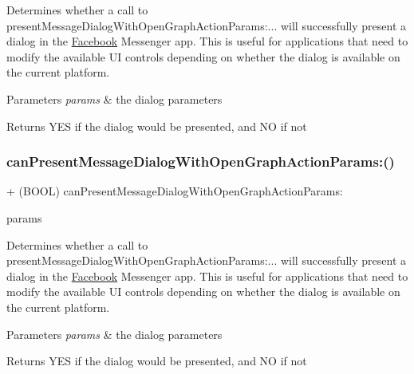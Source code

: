 Determines whether a call to {\ttfamily present\+Message\+Dialog\+With\+Open\+Graph\+Action\+Params\+:...} will successfully present a dialog in the \hyperlink{interfaceFacebook}{Facebook} Messenger app. This is useful for applications that need to modify the available UI controls depending on whether the dialog is available on the current platform.


\begin{DoxyParams}{Parameters}
{\em params} & the dialog parameters\\
\hline
\end{DoxyParams}
\begin{DoxyReturn}{Returns}
Y\+ES if the dialog would be presented, and NO if not 
\end{DoxyReturn}
\mbox{\label{interfaceFBDialogs_abc596dd117701ceb160dd63db514cf11}} 
\subsubsection{\texorpdfstring{can\+Present\+Message\+Dialog\+With\+Open\+Graph\+Action\+Params\+:()}{canPresentMessageDialogWithOpenGraphActionParams:()}\hspace{0.1cm}{\footnotesize\ttfamily [5/5]}}
{\footnotesize\ttfamily + (B\+O\+OL) can\+Present\+Message\+Dialog\+With\+Open\+Graph\+Action\+Params\+: \begin{DoxyParamCaption}\item[{(\hyperlink{interfaceFBOpenGraphActionParams}{F\+B\+Open\+Graph\+Action\+Params} $\ast$)}]{params }\end{DoxyParamCaption}}

Determines whether a call to {\ttfamily present\+Message\+Dialog\+With\+Open\+Graph\+Action\+Params\+:...} will successfully present a dialog in the \hyperlink{interfaceFacebook}{Facebook} Messenger app. This is useful for applications that need to modify the available UI controls depending on whether the dialog is available on the current platform.


\begin{DoxyParams}{Parameters}
{\em params} & the dialog parameters\\
\hline
\end{DoxyParams}
\begin{DoxyReturn}{Returns}
Y\+ES if the dialog would be presented, and NO if not 
\end{DoxyReturn}
\mbox{\label{interfaceFBDialogs_a81544299ca98179464ec34fc0e8d12b7}} 
